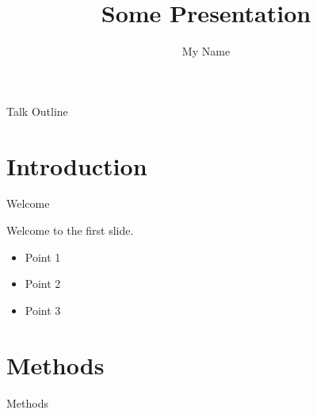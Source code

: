 \documentclass[17pt,serif,mathsans]{beamer}
\author{My Name}
\institute{Some Place}
\title{Some Presentation}
\begin{document}
\rgmbeamerprecontent

\begin{frame}[plain]
  \maketitle
\end{frame}

\begin{frame}{Talk Outline}
  \tableofcontents
\end{frame}

\rgmbeamercontent


\section{Introduction}

\begin{frame}{Welcome}
  \begin{center}
  Welcome to the first slide.

  \begin{itemize}
    \item Point 1
    \item Point 2
    \item Point 3
  \end{itemize}
  \end{center}
\end{frame}

\section{Methods}

\begin{frame}{Methods}
  \begin{center}
  \end{center}
\end{frame}
\end{document}
